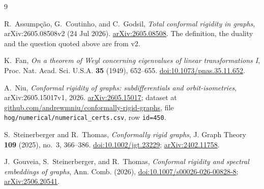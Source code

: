 \documentclass[11pt]{amsart}
\theoremstyle{remark}
\begin{document}
\begin{thebibliography}{9}

R.~Assump\c{c}\~ao, G.~Coutinho, and C.~Godsil,
\emph{Total conformal rigidity in graphs},
arXiv:2605.08508v2 (24 Jul 2026).
\href{https://arxiv.org/abs/2605.08508}{arXiv:2605.08508}.
The definition, the duality and the question quoted above are from v2.

K.~Fan,
\emph{On a theorem of Weyl concerning eigenvalues of linear transformations I},
Proc. Nat. Acad. Sci. U.S.A. \textbf{35} (1949), 652--655.
\href{https://doi.org/10.1073/pnas.35.11.652}{doi:10.1073/pnas.35.11.652}.

A.~Niu,
\emph{Conformal rigidity of graphs: subdifferentials and orbit-isometries},
arXiv:2605.15017v1, 2026.
\href{https://arxiv.org/abs/2605.15017}{arXiv:2605.15017};
dataset at \href{https://github.com/andrewmniu/conformally-rigid-graphs}{github.com/andrewmniu/conformally-rigid-graphs},
file \texttt{hog/numerical/numerical\_certs.csv}, row \texttt{id=450}.

S.~Steinerberger and R.~Thomas,
\emph{Conformally rigid graphs},
J. Graph Theory \textbf{109} (2025), no.~3, 366--386.
\href{https://doi.org/10.1002/jgt.23229}{doi:10.1002/jgt.23229};
\href{https://arxiv.org/abs/2402.11758}{arXiv:2402.11758}.

J.~Gouveia, S.~Steinerberger, and R.~Thomas,
\emph{Conformal rigidity and spectral embeddings of graphs},
Ann. Comb. (2026), \href{https://doi.org/10.1007/s00026-026-00828-8}{doi:10.1007/s00026-026-00828-8};
\href{https://arxiv.org/abs/2506.20541}{arXiv:2506.20541}.

\end{thebibliography}
\end{document}
